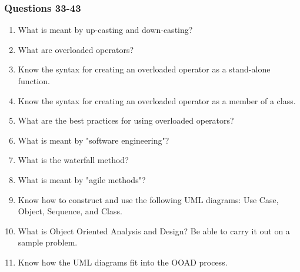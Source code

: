 \documentclass{beamer}
\newcounter{question}
\begin{document}
\begin{frame}
    \frametitle{Questions 33-43}
    \begin{enumerate}[<+->]
        \setcounter{enumi}{\value{question}}
        \item What is meant by up-casting and down-casting?
        \item What are overloaded operators?
        \item Know the syntax for creating an overloaded operator as a stand-alone function.
        \item Know the syntax for creating an overloaded operator as a member of a class.
        \item What are the best practices for using overloaded operators?
        \item What is meant by "software engineering"?
        \item What is the waterfall method?
        \item What is meant by "agile methods"?
        \item Know how to construct and use the following UML diagrams: Use Case, Object, Sequence, and Class.
        \item What is Object Oriented Analysis and Design?  Be able to carry it out on a sample problem.
        \item Know how the UML diagrams fit into the OOAD process.
        \setcounter{question}{\value{enumi}}
    \end{enumerate}
\end{frame}
\end{document}
